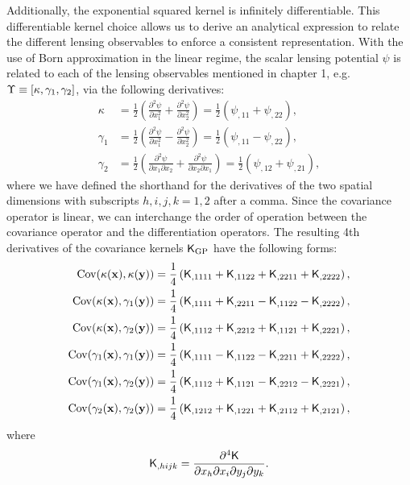 Additionally, the exponential squared kernel is infinitely differentiable. This
differentiable kernel choice allows us to derive an analytical expression to
relate the different lensing observables to enforce a consistent representation.  
With the use of Born approximation in the linear regime, the scalar lensing potential $\psi$ is related to 
each of the lensing observables mentioned in chapter 1, e.g. 
$\Upsilon \equiv [\kappa, \gamma_1, \gamma_2]$, via the following derivatives:
\begin{align}
\kappa &= \frac{1}{2}\left(\frac{\partial^2 \psi}{\partial x_1^2} +
\frac{\partial^2 \psi}{\partial x_2^2 }\right) 
= \frac{1}{2} (\psi_{,11} + \psi_{,22}),\\ 
\gamma_1 
&=\frac{1}{2}\left(\frac{\partial^2 \psi}{\partial x_1^2} - 
\frac{\partial^2 \psi}{\partial x_2^2}\right) 
= \frac{1}{2} (\psi_{,11} - \psi_{,22}), \\
\gamma_2 
&=\frac{1}{2}\left(\frac{\partial^2 \psi}{\partial x_1 \partial
x_2} + \frac{\partial^2 \psi}{\partial x_2 \partial x_1}\right)
= \frac{1}{2} (\psi_{,12} + \psi_{,21}), 
\end{align}
where we have defined the shorthand for the derivatives of the two spatial dimensions with
subscripts $h,i,j,k = 1, 2$ after a comma.
Since the covariance operator is linear, we can interchange the order of
operation between the covariance operator and the differentiation operators. 
The resulting 4th derivatives of the covariance
kernels $\mathsf{K}_{\rm GP}$ have the following forms: 
\begin{align}
	\mathrm{Cov} (\kappa(\mathbf{x}), \kappa(\mathbf{y}))
&= \frac{1}{4}\left(
\mathsf{K}_{,1111} + \mathsf{K}_{,1122} + \mathsf{K}_{,2211} + \mathsf{K}_{,2222}
\right), \label{eq:kernel_derivatives1}\\
\mathrm{Cov}(\kappa(\mathbf{x}), \gamma_1(\mathbf{y})) &= \frac{1}{4}\left(
\mathsf{K}_{,1111} + \mathsf{K}_{,2211} - \mathsf{K}_{,1122} - \mathsf{K}_{,2222}
\right), \\
\mathrm{Cov}(\kappa(\mathbf{x}), \gamma_2(\mathbf{y})) &= \frac{1}{4}\left(
\mathsf{K}_{,1112} + \mathsf{K}_{,2212} + \mathsf{K}_{,1121} + \mathsf{K}_{,2221}
\right),\\
\mathrm{Cov}(\gamma_1(\mathbf{x}), \gamma_1(\mathbf{y})) &= \frac{1}{4}\left(
\mathsf{K}_{,1111} - \mathsf{K}_{,1122} - \mathsf{K}_{,2211} + \mathsf{K}_{,2222}
\right), \\
\mathrm{Cov}(\gamma_1(\mathbf{x}), \gamma_2(\mathbf{y})) &= \frac{1}{4}\left(
\mathsf{K}_{,1112} + \mathsf{K}_{,1121} - \mathsf{K}_{,2212} - \mathsf{K}_{,2221}
\right), \\
\mathrm{Cov}(\gamma_2(\mathbf{x}), \gamma_2(\mathbf{y})) &= \frac{1}{4}\left(
\mathsf{K}_{,1212} + \mathsf{K}_{,1221} + \mathsf{K}_{,2112} + \mathsf{K}_{,2121}
\right), \label{eq:kernel_derivatives2}
\end{align}
where
\begin{equation}
	\mathsf{K}_{,hijk} = \frac{\partial^4 \mathsf{K}}{\partial x_h \partial x_i
	\partial y_j \partial y_k}.
\end{equation}

